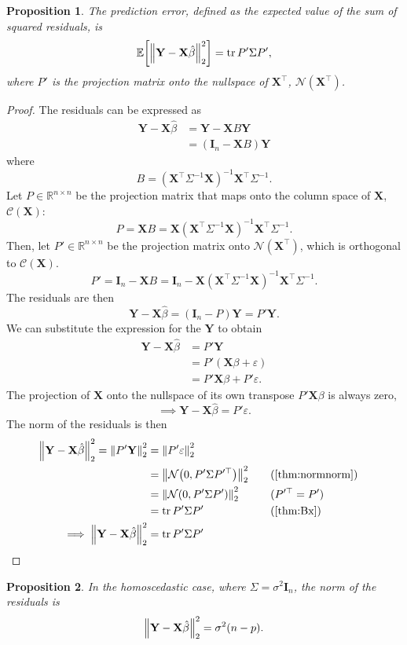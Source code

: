 \documentclass[letterpaper, reqno]{amsart}
\newtheorem{prop}{Proposition}[section]
\numberwithin{equation}{section}
\DeclarePairedDelimiter{\norm}{\lVert}{\rVert}
\newcommand{\T}{\top} %
\newcommand{\vect}[1]{\boldsymbol{\mathbf{#1}}} %
\newcommand{\E}[1]{\mathbb{E}\mleft[#1\mright]}
\newcommand{\R}{\mathbb{R}}  %
\newcommand{\N}[2]{\mathcal{N}\mleft( #1, #2 \mright)}
\newcommand{\by}[1]{&\quad&\text{(#1)}}
\newcommand{\Xm}{\vect{X}}
\newcommand{\Yv}{\vect{Y}}
\newcommand{\Bv}{\beta}
\newcommand{\Bvh}{\hat{\beta}}
\newcommand{\ve}{\varepsilon}
\DeclareMathOperator{\tr}{tr}
\begin{document}
\begin{prop}
  The prediction error, defined as the expected value of the sum of squared
  residuals, is
  \[ \E{\norm*{\Yv - \Xm\Bvh}_2^2} = \tr P' \Sigma P', \]
  where $P'$ is the projection matrix onto the nullspace of $\Xm^\T$,
  $\mathscr{N}(\Xm^\T)$.
\end{prop}

\begin{proof}
  The residuals can be expressed as
  \begin{align*}
    \Yv - \Xm\Bvh &= \Yv - \Xm B \Yv \\
    &= (\vect{I}_n - \Xm B) \Yv
  \end{align*}
  where
  \[ B = (\Xm^\T \Sigma^{-1} \Xm)^{-1} \Xm^\T \Sigma^{-1}. \]
  Let $P \in \R^{n \times n}$ be the projection matrix that maps onto the column
  space of $\Xm$, $\mathscr{C}(\Xm)$:
  \[ P = \Xm B =  \Xm (\Xm^\T \Sigma^{-1} \Xm)^{-1} \Xm^\T \Sigma^{-1}. \]
  Then, let $P' \in \R^{n \times n}$ be the projection matrix onto
  $\mathscr{N}(\Xm^\T)$, which is orthogonal to $\mathscr{C}(\Xm)$.
  \[ P' = \vect{I}_n - \Xm B 
        = \vect{I}_n - \Xm (\Xm^\T \Sigma^{-1} \Xm)^{-1} \Xm^\T \Sigma^{-1}. \]
  The residuals are then
  \[ \Yv - \Xm\Bvh = (\vect{I}_n - P)\Yv = P'\Yv. \]
  We can substitute the expression for the $\Yv$ to obtain
  \begin{align*}
    \Yv - \Xm\Bvh &= P' \Yv \\
    &= P' (\Xm\Bv + \ve) \\
    &= P'\Xm\Bv + P'\ve.
  \end{align*}
  The projection of $\Xm$ onto the nullspace of its own transpose $P'\Xm\Bv$ is
  always zero,
  \[ \implies \Yv - \Xm\Bvh = P'\ve. \]
  The norm of the residuals is then
  \begin{alignat*}{3}
    \norm*{\Yv - \Xm\Bvh}_2^2 = \norm*{P'\Yv}_2^2 &= \norm*{P'\ve}_2^2 \\
    &= \norm*{\N{0}{P'\Sigma P'^\T}}_2^2 \by{\Cref{thm:normnorm}} \\
    &= \norm*{\N{0}{P'\Sigma P'}}_2^2 \by{$P'^\T = P'$} \\
    &= \tr P'\Sigma P' \by{\Cref{thm:Bx}} \\
    \implies \norm*{\Yv - \Xm\Bvh}_2^2 &= \tr P'\Sigma P' \tag*{\qedhere}
  \end{alignat*}
\end{proof}

\begin{prop}
  In the homoscedastic case, where $\Sigma = \sigma^2 \vect{I}_n$, the norm of
  the residuals is  
  \[ \norm*{\Yv - \Xm\Bvh}_2^2 = \sigma^2 (n - p). \]
\end{prop}
\end{document}
